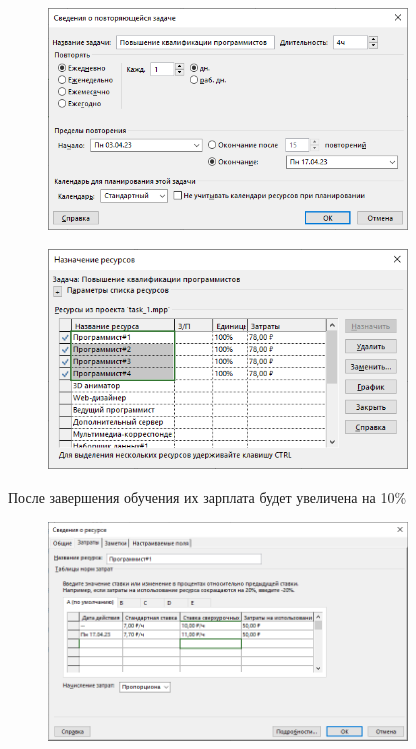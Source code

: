 \begin{figure}[H]
	\begin{center}
		\includegraphics[width=0.85\textwidth]{imgs/task_1_11.png}
	\end{center}
\end{figure}

\begin{figure}[H]
	\begin{center}
		\includegraphics[width=0.85\textwidth]{imgs/task_1_12.png}
	\end{center}
\end{figure}

После завершения обучения их зарплата будет увеличена на 10\%

\begin{figure}[H]
	\begin{center}
		\includegraphics[width=0.85\textwidth]{imgs/task_1_13.png}
	\end{center}
\end{figure}

